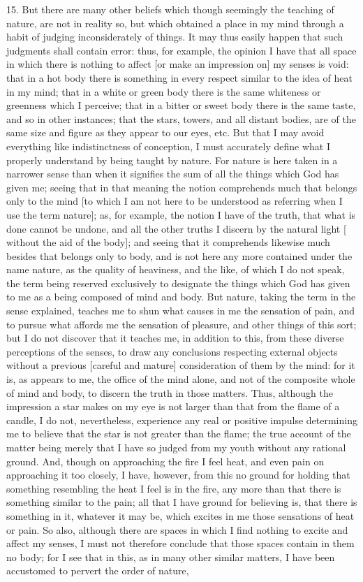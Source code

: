 15. But there are many other beliefs which though seemingly the teaching of nature, are not in reality so, but which obtained a place in my mind through a habit of judging inconsiderately of things. It may thus easily happen that such judgments shall contain error: thus, for example, the opinion I have that all space in which there is nothing to affect [or make an impression on] my senses is void: that in a hot body there is something in every respect similar to the idea of heat in my mind; that in a white or green body there is the same whiteness or greenness which I perceive; that in a bitter or sweet body there is the same taste, and so in other instances; that the stars, towers, and all distant bodies, are of the same size and figure as they appear to our eyes, etc. But that I may avoid everything like indistinctness of conception, I must accurately define what I properly understand by being taught by nature. For nature is here taken in a narrower sense than when it signifies the sum of all the things which God has given me; seeing that in that meaning the notion comprehends much that belongs only to the mind [to which I am not here to be understood as referring when I use the term nature]; as, for example, the notion I have of the truth, that what is done cannot be undone, and all the other truths I discern by the natural light [ without the aid of the body]; and seeing that it comprehends likewise much besides that belongs only to body, and is not here any more contained under the name nature, as the quality of heaviness, and the like, of which I do not speak, the term being reserved exclusively to designate the things which God has given to me as a being composed of mind and body. But nature, taking the term in the sense explained, teaches me to shun what causes in me the sensation of pain, and to pursue what affords me the sensation of pleasure, and other things of this sort; but I do not discover that it teaches me, in addition to this, from these diverse perceptions of the senses, to draw any conclusions respecting external objects without a previous [careful and mature] consideration of them by the mind: for it is, as appears to me, the office of the mind alone, and not of the composite whole of mind and body, to discern the truth in those matters. Thus, although the impression a star makes on my eye is not larger than that from the flame of a candle, I do not, nevertheless, experience any real or positive impulse determining me to believe that the star is not greater than the flame; the true account of the matter being merely that I have so judged from my youth without any rational ground. And, though on approaching the fire I feel heat, and even pain on approaching it too closely, I have, however, from this no ground for holding that something resembling the heat I feel is in the fire, any more than that there is something similar to the pain; all that I have ground for believing is, that there is something in it, whatever it may be, which excites in me those sensations of heat or pain. So also, although there are spaces in which I find nothing to excite and affect my senses, I must not therefore conclude that those spaces contain in them no body; for I see that in this, as in many other similar matters, I have been accustomed to pervert the order of nature, 